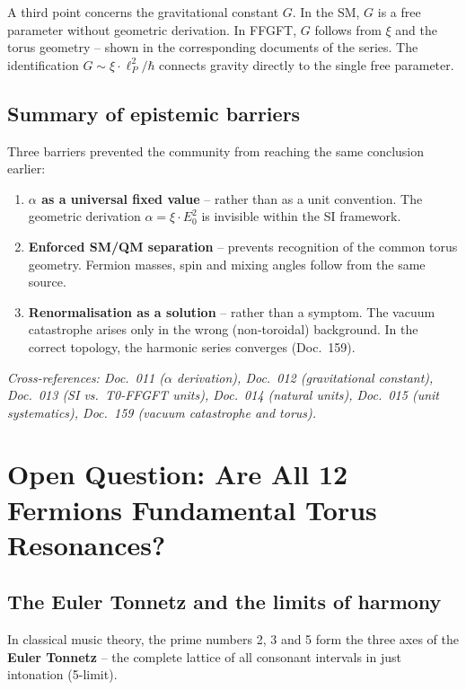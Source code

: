 A third point concerns the gravitational constant $G$. In the SM,
$G$ is a free parameter without geometric derivation. In FFGFT,
$G$ follows from $\xi$ and the torus geometry -- shown in the
corresponding documents of the series. The identification
$G \sim \xi \cdot \ell_P^2 / \hbar$ connects gravity directly to
the single free parameter.

\subsection{Summary of epistemic barriers}

Three barriers prevented the community from reaching the same
conclusion earlier:

\begin{enumerate}
    \item \textbf{$\alpha$ as a universal fixed value} -- rather than
          as a unit convention. The geometric derivation
          $\alpha = \xi \cdot E_0^2$ is invisible within the SI framework.

    \item \textbf{Enforced SM/QM separation} -- prevents recognition
          of the common torus geometry. Fermion masses, spin and
          mixing angles follow from the same source.

    \item \textbf{Renormalisation as a solution} -- rather than a
          symptom. The vacuum catastrophe arises only in the wrong
          (non-toroidal) background. In the correct topology, the
          harmonic series converges (Doc.~159).
\end{enumerate}

\noindent\textit{Cross-references: Doc.~011 ($\alpha$ derivation),
Doc.~012 (gravitational constant), Doc.~013 (SI vs.\ T0-FFGFT units),
Doc.~014 (natural units), Doc.~015 (unit systematics),
Doc.~159 (vacuum catastrophe and torus).}


\section{Open Question: Are All 12 Fermions Fundamental Torus Resonances?}

\subsection{The Euler Tonnetz and the limits of harmony}

In classical music theory, the prime numbers 2, 3 and 5 form the
three axes of the \textbf{Euler Tonnetz} -- the complete lattice of
all consonant intervals in just intonation (5-limit).

